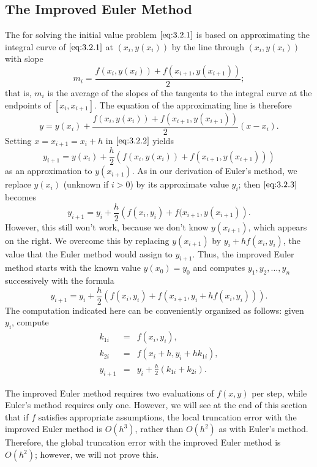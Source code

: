 \documentclass{ximera}
\begin{document}
\subsection*{The Improved Euler Method}

The
 for solving the initial value
problem $\eqref{eq:3.2.1}$ is based on approximating the integral curve of
$\eqref{eq:3.2.1}$ at $(x_i,y(x_i))$ by the line through $(x_i,y(x_i))$ with
slope
$$
m_i=\frac{f(x_i,y(x_i))+f(x_{i+1},y(x_{i+1}))}{2};
$$
that is, $m_i$ is the average of the slopes of the tangents to the
integral curve at the endpoints of $[x_i,x_{i+1}]$. The equation of
the approximating line is therefore
\begin{equation} \label{eq:3.2.2}
y=y(x_i)+\frac{f(x_i,y(x_i))+f(x_{i+1},y(x_{i+1}))}{2}(x-x_i).
\end{equation}
Setting $x=x_{i+1}=x_i+h$ in $\eqref{eq:3.2.2}$ yields
\begin{equation} \label{eq:3.2.3}
y_{i+1}=y(x_i)+\frac{h}{2}\left(f(x_i,y(x_i))+f(x_{i+1},y(x_{i+1}))\right)
\end{equation}
as an approximation to $y(x_{i+1})$. As in our derivation of Euler's
method, we replace $y(x_i)$ (unknown if $i>0$) by its
approximate value $y_i$; then $\eqref{eq:3.2.3}$ becomes
$$
y_{i+1}=y_i+\frac{h}{2}\left(f(x_i,y_i)+f(x_{i+1},y(x_{i+1})\right).
$$
However, this still won't work, because we don't know $y(x_{i+1})$,
which appears on the right. We overcome this by replacing $y(x_{i+1})$
by $y_i+hf(x_i,y_i)$, the value that the  Euler method would
assign to $y_{i+1}$. Thus,  the improved Euler method
starts with the known value $y(x_0)=y_0$ and computes
$y_1, y_2, \dots, y_n$ successively with the formula
\begin{equation} \label{eq:3.2.4}
y_{i+1}=y_i+\frac{h}{2}\left(f(x_i,y_i)+f(x_{i+1},y_i+hf(x_i,y_i))\right).
\end{equation}
The computation indicated here can be conveniently organized as
follows: given $y_i$, compute
\begin{eqnarray*}
k_{1i}&=&f(x_i,y_i),\\
k_{2i}&=&f\left(x_i+h,y_i+hk_{1i}\right),\\
y_{i+1}&=&y_i+\frac{h}{2}(k_{1i}+k_{2i}).
\end{eqnarray*}

The improved Euler method requires two evaluations of $f(x,y)$ per
step, while Euler's method requires only one. However, we will see at
the end of this section that if $f$ satisfies appropriate assumptions,
 the local truncation error with the improved Euler method is
$O(h^3)$, rather than $O(h^2)$ as with Euler's method. Therefore,
the global truncation error with the improved Euler method is
$O(h^2)$; however, we will not prove this.
\end{document}
